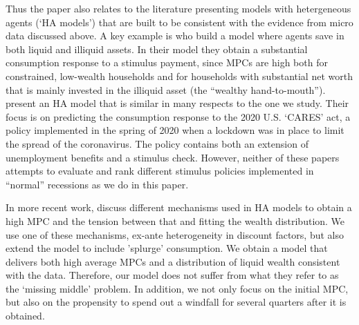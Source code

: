 \documentclass[../HAFiscal]{subfiles}
\begin{document}
Thus the paper also relates to the literature presenting models with hetergeneous agents (`HA models') that are built to be consistent with the evidence from micro data discussed above. A key example is \cite{kaplan2014model} who build a model where agents save in both liquid and illiquid assets. In their model they obtain a substantial consumption response to a stimulus payment, since MPCs are high both for constrained, low-wealth households and for households with substantial net worth that is mainly invested in the illiquid asset (the ``wealthy hand-to-mouth''). \cite{carroll2020modeling} present an HA model that is similar in many respects to the one we study. Their focus is on predicting the consumption response to the 2020 U.S. `CARES' act, a policy implemented in the spring of 2020 when a lockdown was in place to limit the spread of the coronavirus. The policy contains both an extension of unemployment benefits and a stimulus check. However, neither of these papers attempts to evaluate and rank different stimulus policies implemented in ``normal'' recessions as we do in this paper. 

In more recent work, \cite{kaplanMPC2022} discuss different mechanisms used in HA models to obtain a high MPC and the tension between that and fitting the wealth distribution. We use one of these mechanisms, ex-ante heterogeneity in discount factors, but also extend the model to include 'splurge' consumption. We obtain a model that delivers both high average MPCs and a distribution of liquid wealth consistent with the data. Therefore, our model does not suffer from what they refer to as the `missing middle' problem. In addition, we not only focus on the initial MPC, but also on the propensity to spend out a windfall for several quarters after it is obtained. 
\end{document}
